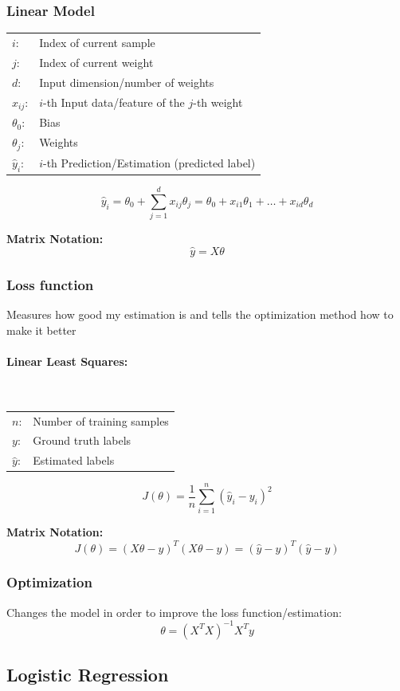 \documentclass[10pt,a4paper]{article}
\begin{document}
\subsubsection{Linear Model}
\begin{tabular}{ll}
	$i$: & Index of current sample \\
	$j$: & Index of current weight \\
	$d$: & Input dimension/number of weights \\
	$x_{ij}$: & $i$-th Input data/feature of the $j$-th weight \\
	$\theta_0$: & Bias \\
	$\theta_j$: & Weights \\
	$\hat y_i$: & $i$-th Prediction/Estimation (predicted label)
\end{tabular}

$$
	\hat y_i = \theta_0 + \sum_{j = 1}^d x_{ij} \theta_j = \theta_0 + x_{i1} \theta_1 + \dots + x_{id} \theta_d
$$

\textbf{Matrix Notation:}
$$
	\hat y = X \theta
$$

\subsubsection{Loss function}
Measures how good my estimation is and tells the optimization method how to make it better

\paragraph{Linear Least Squares:} ~\\
\begin{tabular}{ll}
	$n$: & Number of training samples \\
	$y$: & Ground truth labels \\
	$\hat y$: & Estimated labels
\end{tabular}
$$
	J(\theta) = \frac 1 n \sum_{i = 1}^n (\hat y_i - y_i)^2
$$

\textbf{Matrix Notation:}
$$
	J(\theta) = (X \theta - y)^T (X \theta - y) = (\hat y - y)^T (\hat y - y)
$$

\subsubsection{Optimization}
Changes the model in order to improve the loss function/estimation:
$$
	\theta = (X^TX)^{-1}X^Ty
$$

\subsection{Logistic Regression}
\end{document}

